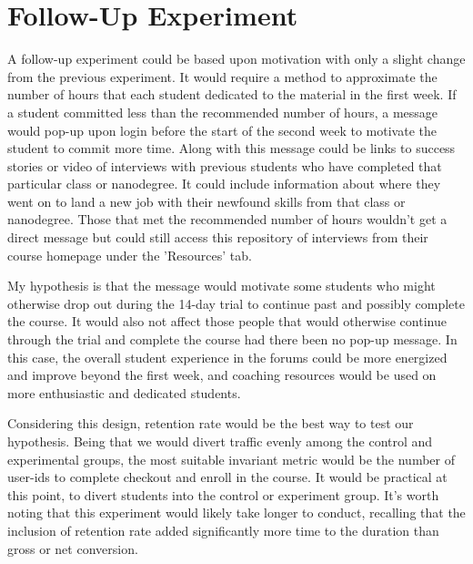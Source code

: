 \documentclass[paper=a4, fontsize=11pt]{scrartcl} %
\numberwithin{equation}{section} %
\numberwithin{figure}{section} %
\numberwithin{table}{section} %
\begin{document}

\section{Follow-Up Experiment}

A follow-up experiment could be based upon motivation with only a slight change from the previous experiment.  It would require a method to approximate the number of hours that each student dedicated to the material in the first week.  If a student committed less than the recommended number of hours, a message would pop-up upon login before the start of the second week to motivate the student to commit more time.  Along with this message could be links to success stories or video of interviews with previous students who have completed that particular class or nanodegree.  It could include information about where they went on to land a new job with their newfound skills from that class or nanodegree.  Those that met the recommended number of hours wouldn't get a direct message but could still access this repository of interviews from their course homepage under the 'Resources' tab. \newline

My hypothesis is that the message would motivate some students who might otherwise drop out during the 14-day trial to continue past and possibly complete the course.  It would also not affect those people that would otherwise continue through the trial and complete the course had there been no pop-up message.  In this case, the overall student experience in the forums could be more energized and improve beyond the first week, and coaching resources would be used on more enthusiastic and dedicated students. \newline

Considering this design, retention rate would be the best way to test our hypothesis.  Being that we would divert traffic evenly among the control and experimental groups, the most suitable invariant metric would be the number of user-id\textquotesingle s to complete checkout and enroll in the course.  It would be practical at this point, to divert students into the control or experiment group.  It's worth noting that this experiment would likely take longer to conduct, recalling that the inclusion of retention rate added significantly more time to the duration than gross or net conversion.
\end{document}
